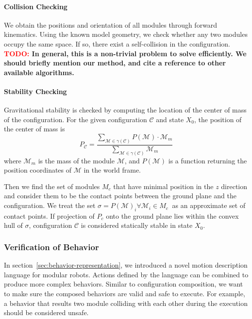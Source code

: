 \documentclass[conference]{IEEEtran}
\theoremstyle{definition}
\newcommand{\TODO}[1]{ {\bf \textcolor{red}{TODO:} #1 }}
\begin{document}
\paragraph{Collision Checking} 
We obtain the positions and orientation of all modules through forward kinematics.
Using the known model geometry, we  check whether any two modules occupy the same space. If so, there exist a self-collision in the configuration.
\TODO{In general, this is a non-trivial problem to solve efficiently.  We should
briefly mention our method, and cite a reference to other available algorithms.}
\paragraph{Stability Checking}
 Gravitational stability is checked by computing the location of the center of mass of the configuration. For the given configuration $\mathcal{C}$
and state \(X_0\), the position of the center of mass is
\begin{equation*}
 P_{\mathcal{C}}=\dfrac{\sum\limits_{\mathcal{M}\in \gamma(\mathcal{C})}{P(\mathcal{M})\cdot \mathcal{M}_m}}{\sum\limits_{\mathcal{M}\in \gamma(\mathcal{C})}{\mathcal{M}_m}}
\end{equation*}
where $\mathcal{M}_m$ is the mass of the module $\mathcal{M}$, and \(P(\mathcal{M})\)
is a function returning the position coordinates of \(\mathcal{M}\) in the world frame.

Then we find the set of modules $M_c$ that have minimal position in the $z$ direction and consider them to
be the contact points between the ground plane and the configuration. We treat the
set \( \sigma = P(\mathcal{M})_i \forall \mathcal{M}_i \in M_c \ \) as an approximate set of contact points.
If projection of \(P_c\) onto the ground plane lies within the convex hull of \(\sigma\),
 configuration $\mathcal{C}$ is considered statically stable in state \(X_0\).

\subsubsection{Verification of Behavior}
In section~\ref{sec:behavior-representation}, we introduced a novel motion description language for modular robots. Actions defined by the language can be combined to produce more complex behaviors. Similar to configuration composition, we want to make sure the composed behaviors are valid and safe to execute. For example, a behavior that results two module colliding with each other during the execution should be considered unsafe.
\end{document}

